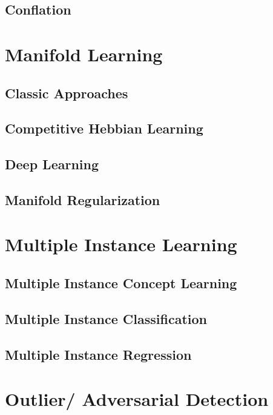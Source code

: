 	\subsection{Conflation}
	
	
\section{Manifold Learning}

	\subsection{Classic Approaches}
	
	\subsection{Competitive Hebbian Learning}
	
	\subsection{Deep Learning}
	
	\subsection{Manifold Regularization}


\section{Multiple Instance Learning}

	\subsection{Multiple Instance Concept Learning}
	
	\subsection{Multiple Instance Classification}
	
	\subsection{Multiple Instance Regression}

\section{Outlier/ Adversarial Detection}